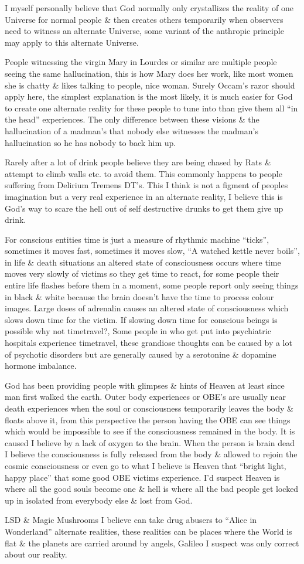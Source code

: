 \documentclass[twocolumn,showpacs,preprintnumbers,amsmath,amssymb]{revtex4}
\begin{document}
I myself personally believe that God normally only 
crystallizes the reality of one Universe for normal people 
\& then creates others temporarily when observers need 
to witness an alternate Universe, some variant of the anthropic
principle may apply to this alternate Universe.

People witnessing the virgin Mary in Lourdes or similar 
are multiple people seeing the same hallucination,
this is how Mary does her work, like most women
she is chatty \& likes talking to people, nice woman.
Surely Occam's razor should apply here,
the simplest explanation is the most likely,
it is much easier for God to create one
alternate reality for these people to tune into
than give them all ``in the head'' experiences. 
The only difference between these visions \& the hallucination
of a madman's that nobody else witnesses the madman's hallucination
so he has nobody to back him up.

Rarely after a lot of drink people believe they
are being chased by Rats \& attempt to climb walls etc.
to avoid them. This commonly happens to people suffering
from Delirium Tremens DT's. This I think is not
a figment of peoples imagination but a very real experience
in an alternate reality, I believe this is God's way to 
scare the hell out of self destructive drunks to get them
give up drink.

For conscious entities time is just a measure of rhythmic
machine ``ticks'', sometimes it moves fast, sometimes it moves
slow, ``A watched kettle never boils'', in life \& death
situations an altered state of consciousness occurs where
time moves very slowly of victims so 
they get time to react, for some people their entire
life flashes before them in a moment, some people report
only seeing things in black \& white because the brain
doesn't have the time to process colour images.
Large doses of adrenalin causes an altered state
of consciousness which slows down time for the victim.
If slowing down time for conscious beings is possible why not timetravel?,
Some people in who get put into psychiatric hospitals
experience timetravel, these grandiose thoughts can be caused
by a lot of psychotic disorders but are generally caused
by a serotonine \& dopamine hormone imbalance.

God has been providing people with glimpses \& hints
of Heaven at least since man first walked the earth.
Outer body experiences or OBE's 
are usually near death experiences when the 
soul or consciousness temporarily leaves the body
\& floats above it, from this perspective the person
having the OBE can see things which would be impossible
to see if the consciousness remained in the body.
It is caused I believe by a lack of oxygen to the brain.
When the person is brain dead I believe the consciousness 
is fully released from the body \&
allowed to rejoin the cosmic consciousness or
even go to what I believe is Heaven that 
``bright light, happy place'' that some good OBE victims experience.
I'd suspect Heaven is where all the good souls become one \& hell
is where all the bad people get locked up in  isolated from everybody else
\& lost from God.

LSD \& Magic Mushrooms I believe can take drug abusers 
to ``Alice in Wonderland''
alternate realities, these realities can be places where the World
is flat \& the planets are carried around by angels, Galileo I suspect was
only correct about our reality.
\end{document}
